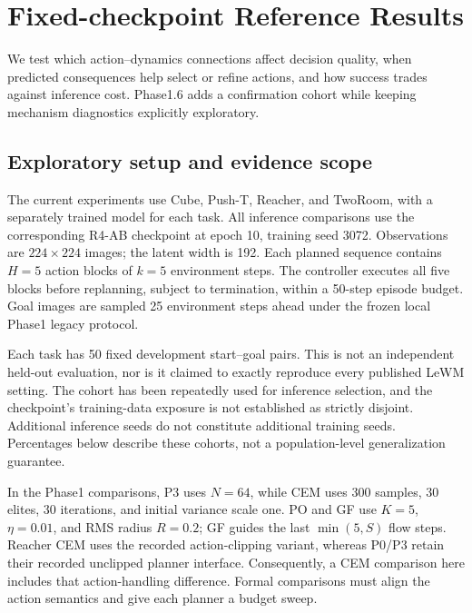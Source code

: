 \section{Fixed-checkpoint Reference Results}
\label{app:reference_results}
We test which action--dynamics connections affect decision quality, when predicted consequences help select or refine actions, and how success trades against inference cost. Phase1.6 adds a confirmation cohort while keeping mechanism diagnostics explicitly exploratory.

\subsection{Exploratory setup and evidence scope}
The current experiments use Cube, Push-T, Reacher, and TwoRoom, with a separately trained model for each task. All inference comparisons use the corresponding R4-AB checkpoint at epoch 10, training seed 3072. Observations are $224\times224$ images; the latent width is 192. Each planned sequence contains $H=5$ action blocks of $k=5$ environment steps. The controller executes all five blocks before replanning, subject to termination, within a 50-step episode budget. Goal images are sampled 25 environment steps ahead under the frozen local Phase1 legacy protocol.

Each task has 50 fixed development start--goal pairs. This is not an independent held-out evaluation, nor is it claimed to exactly reproduce every published LeWM setting. The cohort has been repeatedly used for inference selection, and the checkpoint's training-data exposure is not established as strictly disjoint. Additional inference seeds do not constitute additional training seeds. Percentages below describe these cohorts, not a population-level generalization guarantee.

In the Phase1 comparisons, P3 uses $N=64$, while CEM uses 300 samples, 30 elites, 30 iterations, and initial variance scale one. PO and GF use $K=5$, $\eta=0.01$, and RMS radius $R=0.2$; GF guides the last $\min(5,S)$ flow steps. Reacher CEM uses the recorded action-clipping variant, whereas P0/P3 retain their recorded unclipped planner interface. Consequently, a CEM comparison here includes that action-handling difference. Formal comparisons must align the action semantics and give each planner a budget sweep.

